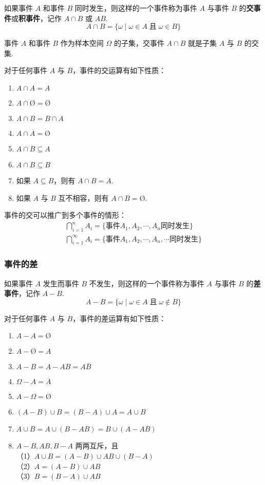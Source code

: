 如果事件 $A$ 和事件 $B$ 同时发生，则这样的一个事件称为事件 $A$ 与事件 $B$ 的\textbf{交事件}或\textbf{积事件}，记作 $A \cap B$ 或 $AB$.
$$
A \cap B = \{ \omega \mid \omega \in A \;\text{且}\; \omega \in B \}
$$

事件 $A$ 和事件 $B$ 作为样本空间 $\varOmega$ 的子集，交事件 $A \cap B$ 就是子集 $A$ 与 $B$ 的交集.

对于任何事件 $A$ 与 $B$，事件的交运算有如下性质：
\begin{enumerate}
    \item $A \cap A = A$
    \item $A \cap \text{\O} = \text{\O}$
    \item $A \cap B = B \cap A$
    \item $A \cap \overline{A} = \text{\O}$
    \item $A \cap B \subseteq A$
    \item $A \cap B \subseteq B$
    \item 如果 $A \subseteq B$，则有 $A \cap B = A$.
    \item 如果 $A$ 与 $B$ 互不相容，则有 $A \cap B = \text{\O}$.
\end{enumerate}

事件的交可以推广到多个事件的情形：
\begin{gather*}
    \bigcap_{i=1}^n A_i = \{ \text{事件} A_1,A_2,\cdots,A_n \text{同时发生} \}\\
    \bigcap_{i=1}^\infty A_i = \{ \text{事件} A_1,A_2,\cdots,A_n,\cdots \text{同时发生} \}
\end{gather*}

\subsubsection{事件的差}

如果事件 $A$ 发生而事件 $B$ 不发生，则这样的一个事件称为事件 $A$ 与事件 $B$ 的\textbf{差事件}，记作 $A-B$.
$$
A - B = \{ \omega \mid \omega \in A \;\text{且}\; \omega \notin B \}
$$

对于任何事件 $A$ 与 $B$，事件的差运算有如下性质：
\begin{enumerate}
    \item $A - A = \text{\O}$
    \item $A - \text{\O} = A$
    \item $A - B = A - AB = A \overline{B}$
    \item $\varOmega - A = \overline{A}$
    \item $A - \varOmega = \text{\O}$
    \item $(A-B) \cup B = (B-A) \cup A = A \cup B$
    \item $A \cup B = A \cup (B-AB) = B \cup (A-AB)$
    \item $A-B,AB,B-A$ 两两互斥，且 \\
    （1）$A \cup B = (A-B) \cup AB \cup (B-A)$\\
    （2）$A = (A-B) \cup AB$\\
    （3）$B = (B-A) \cup AB$
\end{enumerate}

